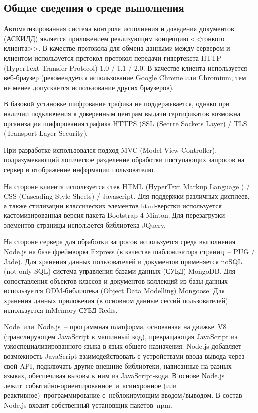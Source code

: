 \subsection{Общие сведения о среде выполнения}
Автоматизированная система контроля исполнения и доведения документов (АСКИДД) является приложением реализующим концепцию <<тонкого клиента>>. В качестве протокола для обмена данными между сервером и клиентом используется протокол протокол передачи гипертекста HTTP (HyperText Transfer Protocol) 1.0 / 1.1 / 2.0. В качестве клиента используется веб-браузер (рекомендуется использование Google Chrome или Chromium, тем не менее допускается использование других браузеров). 

В базовой установке шифрование трафика не поддерживается, однако при наличии подключения к доверенным центрам выдачи сертификатов возможна организация шифорования трафика HTTPS (SSL (Secure Sockets Layer) / TLS (Transport Layer Security).

При разработке использовался подход MVC (Model View Controller), подразумевающий логическое разделение обработки поступающих запросов на сервер и отображение информации пользователю. 

На стороне клиента используется стек HTML (HyperText Markup Language ) / CSS (Cascading Style Sheets) / Javascript. Для поддержки различных дисплеев, а также  стилизации классических элементов html-верстки используется кастомизированная версия  пакета Bootstrap 4 Minton. Для перезагрузки элементов страницы использется библиотека JQuery.

На стороне сервера для обработки запросов используется среда выполнения Node.js на базе фреймворка Express (в качестве шаблонизатора страниц~-- PUG / Jade). Для хранения данных пользователей и документов применяется noSQL (not only SQL) система управления базами данных (СУБД) MongoDB. Для сопоставления объектов классов и документов коллекций из базы данных используется ODM-библиотека (Object Data Modelling)  Mongoose. Для хранения данных приложения (в основном данные сессий пользователей) используется inMemory СУБД Redis.

Node или Node.js -- программная платформа, основанная на движке V8 (транслирующем JavaScript в машинный код), превращающая JavaScript из узкоспециализированного языка в язык общего назначения. Node.js добавляет возможность JavaScript взаимодействовать с  устройствами ввода-вывода через свой API, подключать другие внешние библиотеки, написанные на разных языках, обеспечивая вызовы к ним из JavaScript-кода. В основе Node.js лежит событийно-ориентированное и асинхронное (или реактивное) программирование с неблокирующим вводом/выводом. В состав Node.js входит собственный установщик пакетов npm. 

